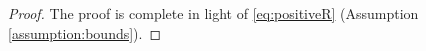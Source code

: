 \documentclass[letterpaper, 10 pt, conference]{ieeeconf}  %
\newcommand{\transpose}{\mathsf{T}}
\begin{document}
\begin{proof}
    The proof is complete in light of \eqref{eq:positiveR} (Assumption \ref{assumption:bounds}).
\end{proof}
\end{document}
